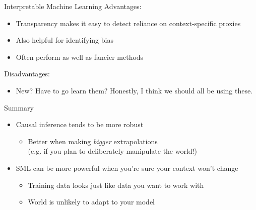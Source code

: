 \documentclass[11pt]{beamer}
\begin{document}
\begin{frame}[c]{Interpretable Machine Learning}
Advantages:
\begin{itemize}
  \item Transparency makes it easy to detect reliance on context-specific proxies
  \item Also helpful for identifying bias
  \item Often perform as well as fancier methods
\end{itemize}
Disadvantages:
\begin{itemize}
  \item New? Have to go learn them? Honestly, I think we should all be using these.
\end{itemize}
\end{frame}

\begin{frame}[c]{Summary}
  \begin{itemize}
    \item Causal inference tends to be more robust
    \begin{itemize}
      \item Better when making \emph{bigger} extrapolations \\
      (e.g. if you plan to deliberately \alert{manipulate} the world!)
    \end{itemize}
    \item SML can be more powerful when you're sure your context won't change
    \begin{itemize}
      \item Training data looks just like data you want to work with
      \item World is unlikely to adapt to your model
    \end{itemize}
  \end{itemize}
\end{frame}
\end{document}
